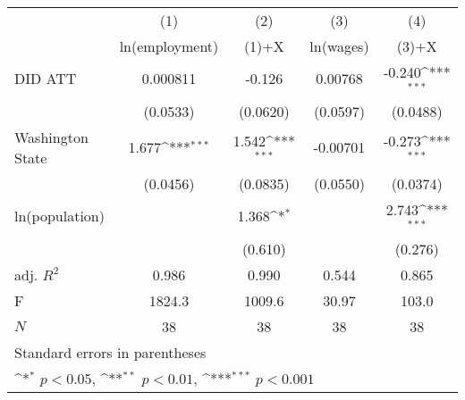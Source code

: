 {
\def\sym#1{\ifmmode^{#1}\else\(^{#1}\)\fi}
\begin{tabular}{l*{4}{c}}
\hline\hline
            &\multicolumn{1}{c}{(1)}&\multicolumn{1}{c}{(2)}&\multicolumn{1}{c}{(3)}&\multicolumn{1}{c}{(4)}\\
            &\multicolumn{1}{c}{ln(employment)}&\multicolumn{1}{c}{(1)+X}&\multicolumn{1}{c}{ln(wages)}&\multicolumn{1}{c}{(3)+X}\\
\hline
DID ATT     &    0.000811         &      -0.126         &     0.00768         &      -0.240\sym{***}\\
            &    (0.0533)         &    (0.0620)         &    (0.0597)         &    (0.0488)         \\
[1em]
Washington State&       1.677\sym{***}&       1.542\sym{***}&    -0.00701         &      -0.273\sym{***}\\
            &    (0.0456)         &    (0.0835)         &    (0.0550)         &    (0.0374)         \\
[1em]
ln(population)&                     &       1.368\sym{*}  &                     &       2.743\sym{***}\\
            &                     &     (0.610)         &                     &     (0.276)         \\
\hline
adj. \(R^{2}\)&       0.986         &       0.990         &       0.544         &       0.865         \\
F           &      1824.3         &      1009.6         &       30.97         &       103.0         \\
\(N\)       &          38         &          38         &          38         &          38         \\
\hline\hline
\multicolumn{5}{l}{\footnotesize Standard errors in parentheses}\\
\multicolumn{5}{l}{\footnotesize \sym{*} \(p<0.05\), \sym{**} \(p<0.01\), \sym{***} \(p<0.001\)}\\
\end{tabular}
}
